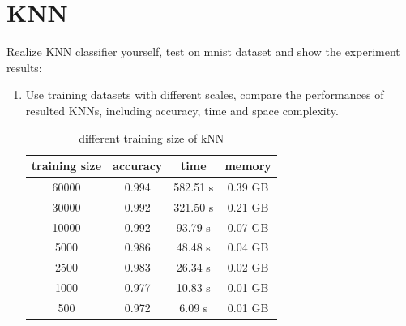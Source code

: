 \documentclass[oneside]{article}
\begin{document}
\section*{KNN}
Realize KNN classifier yourself, test on mnist dataset and show the experiment results:
\begin{enumerate}
\item Use training datasets with different scales, compare the performances of resulted KNNs, including accuracy, time and space complexity.
\begin{table}[!htbp]
\centering
\begin{tabular}{|c|c|c|c|}
\hline
training size  & accuracy & time & memory \\
\hline
60000 & 0.994 & 582.51 s & 0.39 GB  \\
\hline
30000 & 0.992 & 321.50 s & 0.21 GB  \\
\hline
10000 & 0.992 & 93.79 s & 0.07 GB  \\
\hline
5000 & 0.986 & 48.48 s & 0.04 GB  \\
\hline
2500 & 0.983 & 26.34 s & 0.02 GB  \\
\hline
1000 & 0.977 & 10.83 s & 0.01 GB  \\
\hline
500 & 0.972 &  6.09 s & 0.01 GB  \\
\hline
\end{tabular}
\caption{different training size of kNN}
\end{table}


\end{enumerate}
\end{document}
